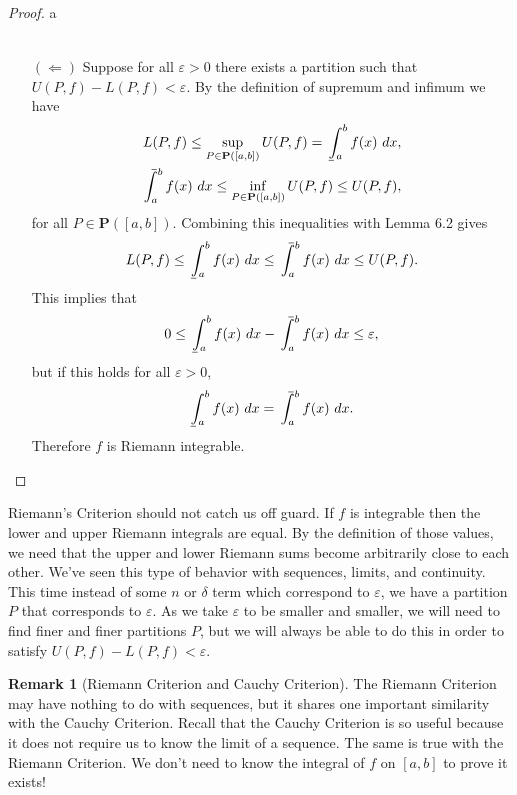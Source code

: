 \documentclass{article}
\def\upint{\mathchoice%
	{\mkern13mu\overline{\vphantom{\intop}\mkern7mu}\mkern-20mu}%
	{\mkern7mu\overline{\vphantom{\intop}\mkern7mu}\mkern-14mu}%
	{\mkern7mu\overline{\vphantom{\intop}\mkern7mu}\mkern-14mu}%
	{\mkern7mu\overline{\vphantom{\intop}\mkern7mu}\mkern-14mu}%
	\int}
\def\lowint{\mkern3mu\underline{\vphantom{\intop}\mkern7mu}\mkern-10mu\int}
\theoremstyle{definition}
\newtheorem{remark}{Remark}[section]
\begin{document}
\begin{proof}{\color{white}a}
\begin{enumerate}
\begin{align*}
		\end{align*}
		\item [$ (\Longleftarrow) $] Suppose for all $ \varepsilon>0 $ there exists a partition such that $ U(P,f)-L(P,f)<\varepsilon $. By the definition of supremum and infimum we have 
		\begin{align*}
				L(P,f)\le\sup\limits_{P\in\textbf{P}([a,b])}U(P,f)=\lowint_{a}^b f(x)\ dx,\\
				\upint_{a}^b f(x)\ dx\le \inf\limits_{P\in\textbf{P}([a,b])}U(P,f)\le U(P,f),
		\end{align*}
		for all $ P\in\mathbf{P}([a,b]) $. Combining this inequalities with Lemma 6.2 gives $$ L(P,f)\le\lowint_{a}^b f(x)\ dx\le\upint_{a}^b f(x)\ dx\le U(P,f).$$ This implies that $$0\le\lowint_{a}^b f(x)\ dx- \upint_{a}^b f(x)\ dx \le \varepsilon,$$ but if this holds for all $ \varepsilon>0 $, $$ \lowint_{a}^b f(x)\ dx = \upint_{a}^b f(x)\ dx.$$ Therefore $ f $ is Riemann integrable. 
	\end{enumerate}
\end{proof}
Riemann's Criterion should not catch us off guard. If $ f $ is integrable then the lower and upper Riemann integrals are equal. By the definition of those values, we need that the upper and lower Riemann sums become arbitrarily close to each other. We've seen this type of behavior with sequences, limits, and continuity. This time instead of some $ n $ or $ \delta $ term which correspond to $ \varepsilon $, we have a partition $ P $ that corresponds to $ \varepsilon $. As we take $ \varepsilon $ to be smaller and smaller, we will need to find finer and finer partitions $ P $, but we will always be able to do this in order to satisfy $ U(P,f)-L(P,f)<\varepsilon $.  
\begin{remark}[Riemann Criterion and Cauchy Criterion]
The Riemann Criterion may have nothing to do with sequences, but it shares one important similarity with the Cauchy Criterion. Recall that the Cauchy Criterion is so useful because it does not require us to know the limit of a sequence. The same is true with the Riemann Criterion. We don't need to know the integral of $ f $ on $ [a,b] $ to prove it exists! 
\end{remark}
\end{document}
